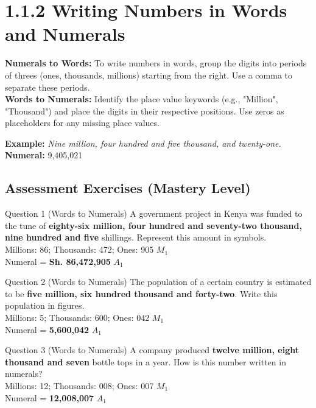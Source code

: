 \documentclass[12pt, a4paper, oneside]{article}
\begin{document}
\section*{1.1.2 Writing Numbers in Words and Numerals}

\begin{tcolorbox}[colback=lightgrey, colframe=primaryblue, title=\textbf{Concept Summary}, arc=5pt]
    \textbf{Numerals to Words:} To write numbers in words, group the digits into periods of threes (ones, thousands, millions) starting from the right. Use a comma to separate these periods. \\
    \textbf{Words to Numerals:} Identify the place value keywords (e.g., "Million", "Thousand") and place the digits in their respective positions. Use zeros as placeholders for any missing place values.
    
    \textbf{Example:} \textit{Nine million, four hundred and five thousand, and twenty-one.} \\
    \textbf{Numeral:} 9,405,021
\end{tcolorbox}

\subsection*{Assessment Exercises (Mastery Level)}

\begin{solvingbox}{Question 1 (Words to Numerals)}
A government project in Kenya was funded to the tune of \textbf{eighty-six million, four hundred and seventy-two thousand, nine hundred and five} shillings. Represent this amount in symbols. \\
Millions: 86; Thousands: 472; Ones: 905 \hfill $M_1$ \\
Numeral = \textbf{Sh. 86,472,905} \hfill $A_1$
\end{solvingbox}

\begin{solvingbox}{Question 2 (Words to Numerals)}
The population of a certain country is estimated to be \textbf{five million, six hundred thousand and forty-two}. Write this population in figures. \\
Millions: 5; Thousands: 600; Ones: 042 \hfill $M_1$ \\
Numeral = \textbf{5,600,042} \hfill $A_1$
\end{solvingbox}

\begin{solvingbox}{Question 3 (Words to Numerals)}
A company produced \textbf{twelve million, eight thousand and seven} bottle tops in a year. How is this number written in numerals? \\
Millions: 12; Thousands: 008; Ones: 007 \hfill $M_1$ \\
Numeral = \textbf{12,008,007} \hfill $A_1$
\end{solvingbox}
\end{document}
